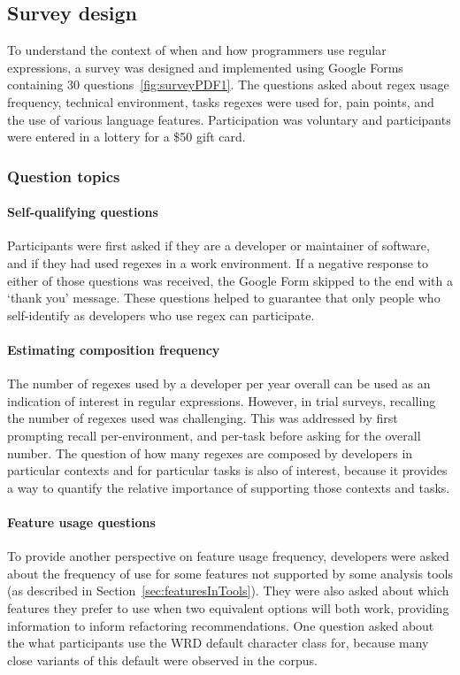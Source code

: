 \subsection{Survey design}

To understand the context of when and how programmers use regular expressions, a survey was designed and implemented using Google Forms containing 30 questions~\ref{fig:surveyPDF1}. The questions asked about regex usage frequency, technical environment, tasks regexes were used for, pain points, and the use of various language
features. Participation was voluntary and participants were entered in a lottery for a \$50 gift card.

\subsubsection{Question topics}
\paragraph{Self-qualifying questions} Participants were first asked if they are a developer or maintainer of software, and if they had used regexes in a work environment.  If a negative response to either of those questions was received, the Google Form skipped to the end with a `thank you' message.  These questions helped to guarantee that only people who self-identify as developers who use regex can participate.

\paragraph{Estimating composition frequency} The number of regexes used by a developer per year overall can be used as an indication of interest in regular expressions.  However, in trial surveys, recalling the number of regexes used was challenging.  This was addressed by first prompting recall per-environment, and per-task before asking for the overall number.  The question of how many regexes are composed by developers in particular contexts and for particular tasks is also of interest, because it provides a way to quantify the relative importance of supporting those contexts and tasks.

\paragraph{Feature usage questions} To provide another perspective on feature usage frequency, developers were asked about the frequency of use for some features not supported by some analysis tools (as described in Section~\ref{sec:featuresInTools}).  They were also asked about which features they prefer to use when two equivalent options will both work, providing information to inform refactoring recommendations.  One question asked about the what participants use the WRD default character class for, because many close variants of this default were observed in the corpus.


